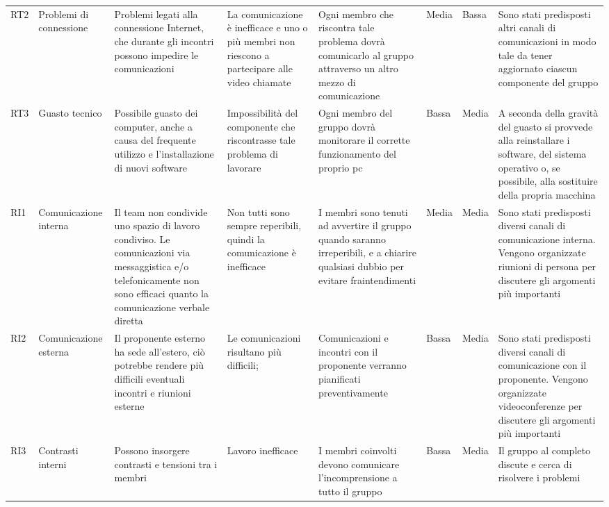 \begin{landscape}
\begin{longtable}{p{0.6cm}|p{2.2cm}|p{3.2cm}|p{2cm}|p{4cm}|p{0.9cm}|p{0.8cm}|p{4cm}}
		RT2 & Problemi di connessione & Problemi legati alla connessione Internet, che durante gli incontri possono impedire le comunicazioni & La comunicazione è inefficace e uno o più membri non riescono a partecipare alle video chiamate & Ogni membro che riscontra tale problema dovrà comunicarlo al gruppo attraverso un altro mezzo di comunicazione & Media & Bassa & Sono stati predisposti altri canali di comunicazioni in modo tale da tener aggiornato ciascun componente del gruppo \\
		RT3 & Guasto tecnico & Possibile guasto dei computer, anche a causa del frequente utilizzo e l'installazione di nuovi software & Impossibilità del componente che riscontrasse tale problema di lavorare & Ogni membro del gruppo dovrà monitorare il corrette funzionamento del proprio pc & Bassa& Media& A seconda della gravità del guasto si provvede alla reinstallare i software, del sistema operativo o, se possibile, alla sostituire della propria macchina\\
		RI1 & Comunicazione interna & Il team non condivide uno spazio di lavoro condiviso. Le comunicazioni via messaggistica e/o telefonicamente non sono efficaci quanto la comunicazione verbale diretta & Non tutti sono sempre reperibili, quindi la comunicazione è inefficace & I membri sono tenuti ad avvertire il gruppo quando saranno irreperibili, e a chiarire qualsiasi dubbio per evitare fraintendimenti & Media & Media & Sono stati predisposti diversi canali di comunicazione interna. Vengono organizzate riunioni di persona per discutere gli argomenti più importanti\\
		RI2 & Comunicazione esterna & Il proponente esterno ha sede all’estero, ciò potrebbe rendere più difficili eventuali incontri e riunioni esterne & Le comunicazioni risultano più difficili; & Comunicazioni e incontri con il proponente verranno pianificati preventivamente & Bassa & Media & Sono stati predisposti diversi canali di comunicazione con il proponente. Vengono organizzate videoconferenze per discutere gli argomenti più importanti \\
		RI3 & Contrasti interni     & Possono insorgere contrasti e tensioni tra i membri                                                                                                                  & Lavoro inefficace                                                      & I membri coinvolti devono comunicare l’incomprensione a tutto il gruppo                                                            & Bassa & Media & Il gruppo al completo discute e cerca di risolvere i problemi  \\

\end{longtable}
\end{landscape}
